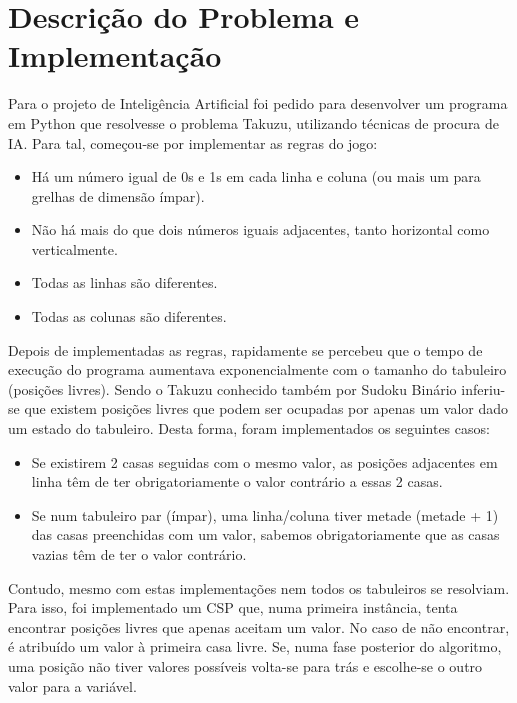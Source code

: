 \documentclass[12pt,a4paper]{article}
\begin{document}
  \section{Descrição do Problema e Implementação}

  Para o projeto de Inteligência Artificial foi pedido para desenvolver um programa em Python que resolvesse o problema Takuzu, utilizando técnicas de procura de IA.
  Para tal, começou-se por implementar as regras do jogo:

  \begin{itemize}
    \setlength{\itemsep}{0pt}
    \item Há um número igual de 0s e 1s em cada linha e coluna (ou mais um para grelhas de
    dimensão ímpar).
    \item Não há mais do que dois números iguais adjacentes, tanto horizontal como verticalmente.
    \item Todas as linhas são diferentes.
    \item Todas as colunas são diferentes.
  \end{itemize}

  Depois de implementadas as regras, rapidamente se percebeu que o tempo de execução do programa aumentava exponencialmente com o tamanho do tabuleiro (posições livres).
  Sendo o Takuzu conhecido também por Sudoku Binário inferiu-se que existem posições livres que podem ser ocupadas por apenas um valor dado um estado do tabuleiro. 
  Desta forma, foram implementados os seguintes casos:
  \begin{itemize}
    \setlength{\itemsep}{0pt}
    \item Se existirem 2 casas seguidas com o mesmo valor, as posições adjacentes em linha têm de ter obrigatoriamente o valor contrário a essas 2 casas.
    \item Se num tabuleiro par (ímpar), uma linha/coluna tiver metade (metade + 1) das casas preenchidas com um valor, sabemos obrigatoriamente que as casas vazias têm de ter o valor contrário. 
  \end{itemize}

  Contudo, mesmo com estas implementações nem todos os tabuleiros se resolviam.
  Para isso, foi implementado um CSP que, numa primeira instância, tenta encontrar posições livres que apenas aceitam um valor.
  No caso de não encontrar, é atribuído um valor à primeira casa livre.
  Se, numa fase posterior do algoritmo, uma posição não tiver valores possíveis volta-se para trás e escolhe-se o outro valor para a variável.
\end{document}
